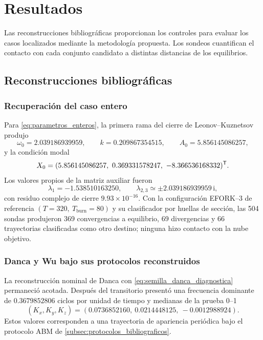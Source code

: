 \section{Resultados}
\label{sec:resultados}

Las reconstrucciones bibliográficas proporcionan los controles para evaluar
los casos localizados mediante la metodología propuesta. Los sondeos
cuantifican el contacto con cada conjunto candidato a distintas distancias
de los equilibrios.

\subsection{Reconstrucciones bibliográficas}
\label{subsec:resultados_bibliograficos}

\subsubsection{Recuperación del caso entero}

Para \cref{eq:parametros_enteros}, la primera rama del cierre de
Leonov--Kuznetsov produjo
\begin{equation}
\omega_0=2.039186939959,\qquad
k=0.209867354515,\qquad
A_0=5.856145086257,
\label{eq:resultados_armonicos_enteros}
\end{equation}
y la condición modal
\begin{equation}
X_0=(5.856145086257,\ 0.369331578247,\ -8.366536168332)^{\T}.
\label{eq:resultado_semilla_entera}
\end{equation}
Los valores propios de la matriz auxiliar fueron
\[
\lambda_1=-1.538510163250,\qquad
\lambda_{2,3}\simeq\pm2.039186939959\,\mathrm i,
\]
con residuo complejo de cierre \(9.93\times10^{-16}\). Con la configuración
EFORK--3 de referencia \((T=320,\ T_{\mathrm{burn}}=80)\) y su clasificador por
huellas de sección, las 504 sondas produjeron 369 convergencias a equilibrio,
69 divergencias y 66 trayectorias clasificadas como otro destino; ninguna hizo
contacto con la nube objetivo.

\subsubsection{Danca y Wu bajo sus protocolos reconstruidos}

La reconstrucción nominal de Danca con
\cref{eq:semilla_danca_diagnostica} permaneció acotada. Después del transitorio
presentó una frecuencia dominante de \(0.3679852806\) ciclos por unidad de
tiempo y medianas de la prueba 0--1
\begin{equation}
(K_x,K_y,K_z)
=(0.0736852160,\ 0.0214448125,\ -0.0012988924).
\label{eq:resultado_danca_k}
\end{equation}
Estos valores corresponden a una trayectoria de apariencia periódica bajo el
protocolo ABM de \cref{subsec:protocolos_bibliograficos}.

